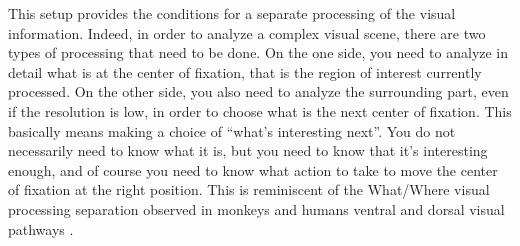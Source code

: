 This setup provides the conditions for a separate processing of the visual information.
Indeed, in order to analyze a complex visual scene, there are two types of processing that need to be done. On the one side, you need  to analyze in detail what is at the center of fixation, that is the region of interest currently processed. On the other side, you also need to analyze the surrounding part, even if the resolution is low, in order to choose what is the next center of fixation. This basically means making a choice of “what’s interesting next”. You do not necessarily need to know what it is, but you need to know that it’s interesting enough, and of course you need to know what action to take to move the center of fixation at the right position. This is reminiscent of the What/Where visual processing separation observed in monkeys and humans ventral and dorsal visual pathways \cite{mishkin1983object}.

